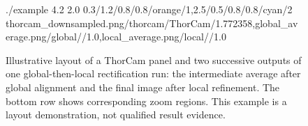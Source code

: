 \documentclass{article}
\begin{document}
\begin{figure}[htbp]
    \centering
    \TrioComparisonFigure
        {./example}
        {4.2}
        {2.0}
        {0.3/1.2/0.8/0.8/orange/1,2.5/0.5/0.8/0.8/cyan/2}
        {thorcam_downsampled.png/thorcam/ThorCam/1.772358,global_average.png/global//1.0,local_average.png/local//1.0}

    \caption{Illustrative layout of a ThorCam panel and two successive outputs of one global-then-local rectification run: the intermediate average after global alignment and the final image after local refinement. The bottom row shows corresponding zoom regions. This example is a layout demonstration, not qualified result evidence.}
    \label{fig:reconstruction_comparison}
\end{figure}
\end{document}
